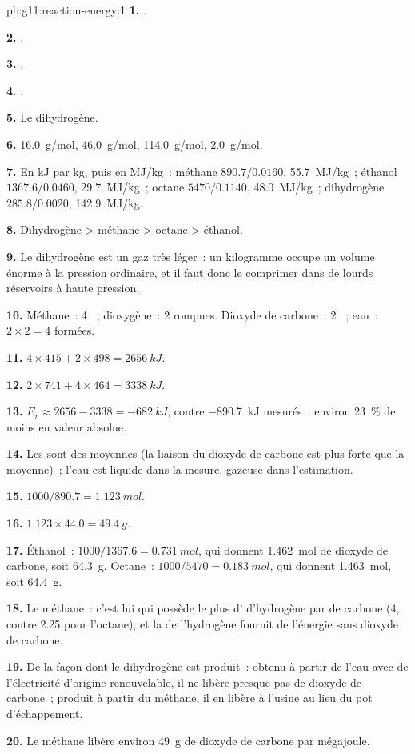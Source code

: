 \begin{solution}{pb:g11:reaction-energy:1}
\textbf{1.} .

\textbf{2.} .

\textbf{3.} .

\textbf{4.} .

\textbf{5.} Le dihydrogène.

\textbf{6.} \qty{16.0}{g/mol}, \qty{46.0}{g/mol}, \qty{114.0}{g/mol},
\qty{2.0}{g/mol}.

\textbf{7.} En \si{kJ} par \si{kg}, puis en \si{MJ/kg}~: méthane
$890.7 / 0.0160$, \qty{55.7}{MJ/kg}~; éthanol $1367.6 / 0.0460$,
\qty{29.7}{MJ/kg}~; octane $5470 / 0.1140$, \qty{48.0}{MJ/kg}~;
dihydrogène $285.8 / 0.0020$, \qty{142.9}{MJ/kg}.

\textbf{8.} Dihydrogène > méthane > octane > éthanol.

\textbf{9.} Le dihydrogène est un gaz très léger~: un kilogramme occupe
un volume énorme à la pression ordinaire, et il faut donc le comprimer
dans de lourds réservoirs à haute pression.

\textbf{10.} Méthane~: 4 ~; dioxygène~: 2  rompues.
Dioxyde de carbone~: 2 ~; eau~: $2 \times 2 = 4$ 
formées.

\textbf{11.} $4 \times 415 + 2 \times 498 = \qty{2656}{kJ}$.

\textbf{12.} $2 \times 741 + 4 \times 464 = \qty{3338}{kJ}$.

\textbf{13.} $E_r \approx 2656 - 3338 = \qty{-682}{kJ}$, contre
\qty{-890.7}{kJ} mesurés~: environ \qty{23}{\percent} de moins en valeur
absolue.

\textbf{14.} Les  sont des moyennes (la liaison
 du dioxyde de carbone est plus forte que la moyenne)~; l'eau est
liquide dans la mesure, gazeuse dans l'estimation.

\textbf{15.} $1000 / 890.7 = \qty{1.123}{mol}$.

\textbf{16.} $1.123 \times 44.0 = \qty{49.4}{g}$.

\textbf{17.} Éthanol~: $1000 / 1367.6 = \qty{0.731}{mol}$, qui donnent
\qty{1.462}{mol} de dioxyde de carbone, soit \qty{64.3}{g}. Octane~:
$1000 / 5470 = \qty{0.183}{mol}$, qui donnent \qty{1.463}{mol}, soit
\qty{64.4}{g}.

\textbf{18.} Le méthane~: c'est lui qui possède le plus d'
d'hydrogène par  de carbone (4, contre 2.25 pour l'octane), et la
 de l'hydrogène fournit de l'énergie sans dioxyde de carbone.

\textbf{19.} De la façon dont le dihydrogène est produit~: obtenu à
partir de l'eau avec de l'électricité d'origine renouvelable, il ne
libère presque pas de dioxyde de carbone~; produit à partir du méthane,
il en libère à l'usine au lieu du pot d'échappement.

\textbf{20.} Le méthane libère environ \qty{49}{g} de dioxyde de carbone
par mégajoule.
\end{solution}
